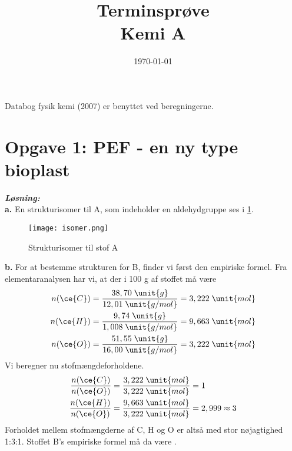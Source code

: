 \documentclass{report}
\title{Terminsprøve\\
{\Large \textbf{Kemi A}}}
\date{\today}
\newcommand{\sol}{\setlength{\parindent}{0cm}\textbf{\textit{Løsning:}}\setlength{\parindent}{1cm}}
\begin{document}
\maketitle
\begin{note}
  Databog fysik kemi (2007) er benyttet ved beregningerne.
\end{note}
\section*{Opgave 1: PEF - en ny type bioplast}
\sol \\
\textbf{a.}
En strukturisomer til A, som indeholder en aldehydgruppe ses i \cref{fig:isomer}.
\begin{figure}[H]
\begin{center}
  \texttt{[image: isomer.png]}
\end{center}
\caption{Strukturisomer til stof A}
\label{fig:isomer}
\end{figure}
\noindent \textbf{b.}
For at bestemme strukturen for B, finder vi først den empiriske formel.
Fra elementaranalysen har vi, at der i 100 g af stoffet må være
\begin{equation*}
\begin{split}
  n(\ce{C} )&=\frac{38,70 \;\unit{g} }{12,01 \;\unit{g/mol} }= 3,222 \;\unit{mol} \\
  n(\ce{H} )&=\frac{9,74 \;\unit{g} }{1,008 \;\unit{g/mol} }= 9,663 \;\unit{mol} \\
  n(\ce{O})&=\frac{51,55 \;\unit{g} }{16,00 \;\unit{g/mol} }= 3,222 \;\unit{mol} 
\end{split}
\end{equation*}
Vi beregner nu stofmængdeforholdene.
\begin{equation*}
\begin{split}
  \frac{n(\ce{C} )}{n(\ce{O} )}&=\frac{3,222 \;\unit{mol} }{3,222 \;\unit{mol} }= 1\\
  \frac{n(\ce{H} )}{n(\ce{O} )}&=\frac{9,663 \;\unit{mol} }{3,222 \;\unit{mol} }=2,999 \approx 3
\end{split}
\end{equation*}
Forholdet mellem stofmængderne af C, H og O er altså med stor nøjagtighed 1:3:1.
Stoffet B's empiriske formel må da være .
\end{document}
